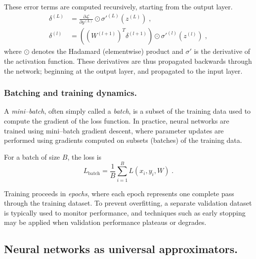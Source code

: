             These error terms are computed recursively, starting from the output layer.
            \begin{align}
                \delta^{(L)} &= \frac{\partial \mathcal{L}}{\partial y^{(L)}} \odot \sigma'^{(L)}(z^{(L)})\;, \\
                \delta^{(l)} &= ((W^{(l+1)})^T \delta^{(l+1)}) \odot \sigma'^{(l)}(z^{(l)})\;,
            \end{align}
            where \(\odot\) denotes the Hadamard (elementwise) product and \(\sigma'\) is the derivative of the activation function.
            These derivatives are thus propagated backwards through the network; beginning at the output layer, and propagated to the input layer.

        
        \subsubsection{Batching and training dynamics.}
            \begin{definition}[Batch]
                A \emph{mini--batch}, often simply called a \emph{batch}, is a subset of the training data used to compute the gradient of the loss function.
                In practice, neural networks are trained using mini--batch gradient descent, where parameter updates are performed using gradients computed on subsets (batches) of the training data.
            \end{definition}
            
            For a batch of size \(B\), the loss is
            \begin{equation}
                L_{\text{batch}} = \frac{1}{B}\sum_{i=1}^B L(x_i, y_i, W)\;.
            \end{equation}

            Training proceeds in \emph{epochs}, where each epoch represents one complete pass through the training dataset.
            To prevent overfitting, a separate validation dataset is typically used to monitor performance, and techniques such as early stopping may be applied when validation performance plateaus or degrades.
    \subsection{Neural networks as universal approximators.}

